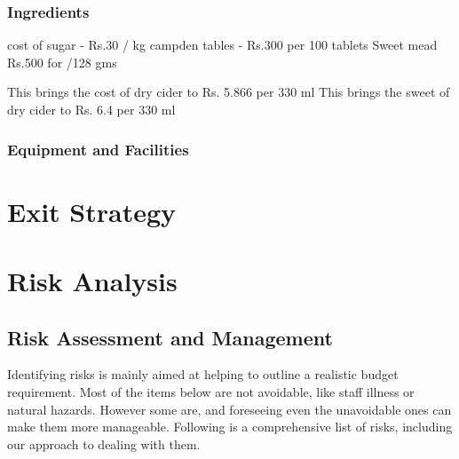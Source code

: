 \documentclass[11pt]{article}
\begin{document}
    \subsubsection{Ingredients}
cost of sugar -  Rs.30 / kg
campden tables  - Rs.300 per 100 tablets
Sweet mead Rs.500 for /128 gms


This brings the cost of dry cider to Rs. 5.866 per 330 ml
This brings the sweet of dry cider to Rs. 6.4 per 330 ml

     \subsubsection{Equipment and Facilities}

\newpage
\section{Exit Strategy}

\newpage
\section{Risk Analysis}

  \subsection{Risk Assessment and Management}
Identifying risks is mainly aimed at helping to outline a realistic budget requirement. Most of the items below are not avoidable, like staff illness or natural hazards. However some are, and foreseeing even the unavoidable ones can make them more manageable. Following is a comprehensive list of risks, including our approach to dealing with them.
\end{document}

